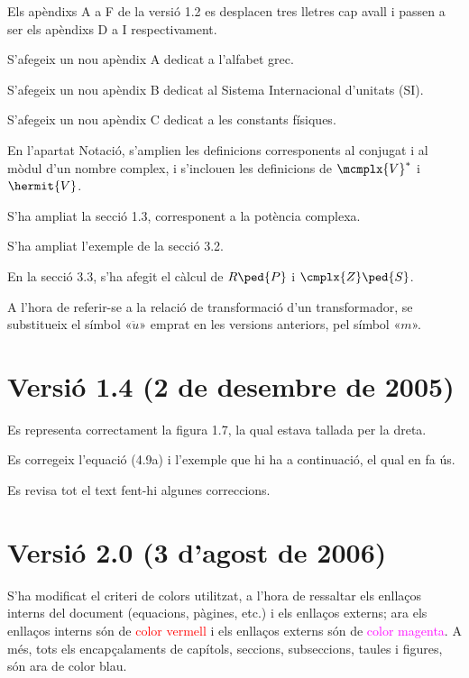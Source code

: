 Els apèndixs A a F de la versió 1.2 es desplacen tres lletres cap
avall i passen a ser els apèndixs D a I respectivament.

S'afegeix un nou apèndix A dedicat a l'alfabet grec.

S'afegeix un nou apèndix B dedicat al Sistema Internacional
d'unitats (SI).

S'afegeix un nou apèndix C dedicat a les constants físiques.

En l'apartat Notació, s'amplien les definicions corresponents al
conjugat i al mòdul d'un nombre complex, i s'inclouen les
definicions de $\mcmplx{V}^*$ i $\hermit{V}$.

S'ha ampliat la secció 1.3, corresponent a la
potència complexa.

 S'ha ampliat l'exemple de la secció 3.2.

En la secció 3.3, s'ha afegit el càlcul de $R\ped{P}$ i
$\cmplx{Z}\ped{S}$.

 A l'hora de referir-se a la
relació de transformació d'un transformador, se substitueix el
símbol «$\ddot{u}$» emprat en les versions anteriors, pel símbol
«$m$».

\section*{Versió 1.4 (2 de desembre de 2005)}

Es representa correctament la figura 1.7, la qual estava
tallada per la dreta.

Es corregeix l'equació (4.9a) i l'exemple que hi
ha a continuació, el qual en fa ús.

Es revisa tot el text fent-hi algunes correccions.

\section*{Versió 2.0 (3 d'agost de 2006)}

S'ha modificat el criteri de colors utilitzat, a l'hora de ressaltar
els enllaços interns del document (equacions, pàgines, etc.) i els
enllaços externs; ara els enllaços interns són de
\textcolor{red}{color vermell} i els enllaços externs són de
\textcolor{magenta}{color magenta}. A més, tots els encapçalaments
de capítols, seccions,
 subseccions, taules  i figures, són ara de
 \textcolor{NavyBlue}{color blau}.

